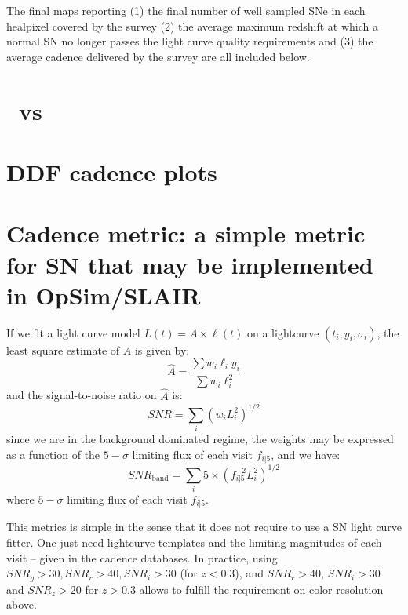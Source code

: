 \begin{appendices}
  The final maps reporting (1) the final number of well sampled SNe in
  each healpixel covered by the survey (2) the average maximum
  redshift at which a normal SN no longer passes the light curve
  quality requirements and (3) the average cadence delivered by the
  survey are all included below.



  
\clearpage

\section{\opsim~vs \altsched}
\label{sec:opsim_altsched}



\clearpage

\section{DDF cadence plots}



\clearpage

\section{Cadence metric: a simple metric for SN that may be implemented in OpSim/SLAIR}
\label{sec:cadencemetric}

If we fit a light curve model $L(t) = A \times \ell(t)$ on a
lightcurve $(t_i, y_i, \sigma_i)$, the least square estimate of $A$ is
given by:
$$
\hat{A} = \frac{\sum w_i \ell_i y_i}{\sum w_i \ell_i^2}
$$
and the signal-to-noise ratio on $\hat{A}$ is:
$$
SNR = \sum_i (w_i L_i^2)^{1/2}
$$ since we are in the background dominated regime, the weights may be
expressed as a function of the $5-\sigma$ limiting flux of each visit
$f_{i|5}$, and we have:
$$
SNR_{\mathrm{band}} = \sum_{i} 5 \times (f^{-2}_{i|5} L_i^2)^{1/2}
$$
where $5-\sigma$ limiting flux of each visit $f_{i|5}$.

This metrics is simple in the sense that it does not require to use a SN
light curve fitter. One just need lightcurve templates and the
limiting magnitudes of each visit -- given in the cadence
databases. In practice, using $SNR_g > 30, SNR_r > 40, SNR_i > 30$
(for $z<0.3$), and $SNR_r > 40$, $SNR_i > 30$ and $SNR_z > 20$ for
$z>0.3$ allows to fulfill the requirement on color resolution above.


\end{appendices}
